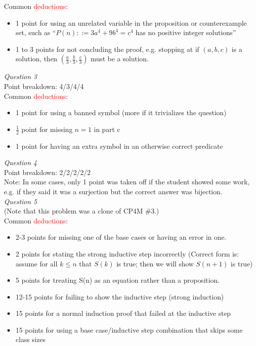\documentclass[12pt]{article}
\begin{document}
\noindent
Common \textcolor{red}{deductions}:
\begin{itemize}
\item 1 point for using an unrelated variable in the proposition or counterexample set, such as ``$P(n) ::= 3a^4 + 9b^4 = c^4$ has no positive integer solutions''
\item 1 to 3 points for not concluding the proof, e.g. stopping at if $(a, b, c)$ is a solution, then $(\frac{a}{3}, \frac{b}{3}, \frac{c}{3})$ must be a solution. 
 
\end{itemize}

\noindent
\emph{Question 3}\\
Point breakdown: 4/3/4/4\\
Common \textcolor{red}{deductions}:
\begin{itemize}
\item 1 point for using a banned symbol (more if it trivializes the question)
\item $\frac{1}{2}$ point for missing $n=1$ in part c
\item 1 point for having an extra symbol in an otherwise correct predicate
\end{itemize}

\noindent
\emph{Question 4}\\
Point breakdown: 2/2/2/2/2\\
Note: In some cases, only 1 point was taken off if the student showed some work, e.g. if they said it was a surjection but the correct answer was bijection. \\

\noindent
\emph{Question 5}\\
(Note that this problem was a clone of CP4M \#3.)\\
Common \textcolor{red}{deductions}:
\begin{itemize}
\item 2-3 points for missing one of the base cases or having an error in one. 
\item 2 points for stating the strong inductive step incorrectly (Correct form is: assume for all $k\leq n$ that $S(k)$ is true; then we will show $S(n+1)$ is true) 
\item 5 points for treating S(n) as an equation rather than a proposition. 
\item 12-15 points for failing to show the inductive step (strong induction)
\item 15 points for a normal induction proof that failed at the inductive step
\item 15 points for using a base case/inductive step combination that skips some class sizes 

\end{itemize}
\end{document}
